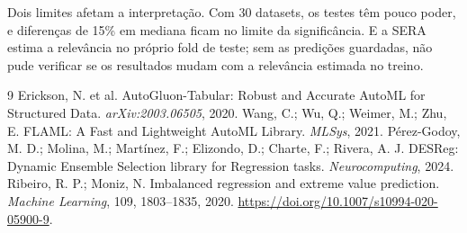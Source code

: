 \documentclass[10pt,a4paper]{article}
\begin{document}
Dois limites afetam a interpretação. Com 30 datasets, os testes têm pouco poder, e diferenças de 15\% em mediana ficam no limite da significância. E a SERA estima a relevância no próprio fold de teste; sem as predições guardadas, não pude verificar se os resultados mudam com a relevância estimada no treino.

\begin{thebibliography}{9}
\small
{} Erickson, N. et al. AutoGluon-Tabular: Robust and Accurate AutoML for Structured Data. \textit{arXiv:2003.06505}, 2020.
 Wang, C.; Wu, Q.; Weimer, M.; Zhu, E. FLAML: A Fast and Lightweight AutoML Library. \textit{MLSys}, 2021.
 Pérez-Godoy, M. D.; Molina, M.; Martínez, F.; Elizondo, D.; Charte, F.; Rivera, A. J. DESReg: Dynamic Ensemble Selection library for Regression tasks. \textit{Neurocomputing}, 2024.
 Ribeiro, R. P.; Moniz, N. Imbalanced regression and extreme value prediction. \textit{Machine Learning}, 109, 1803--1835, 2020. \url{https://doi.org/10.1007/s10994-020-05900-9}.
\end{thebibliography}
\end{document}
